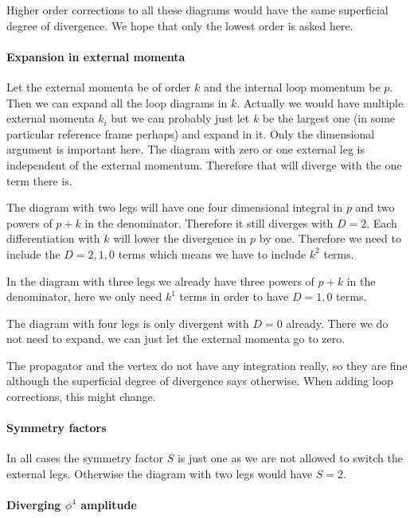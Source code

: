 \documentclass[11pt, english, fleqn, DIV=15, headinclude]{scrartcl}
\begin{document}
Higher order corrections to all these diagrams would have the same superficial
degree of divergence. We hope that only the lowest order is asked here.

\paragraph{Expansion in external momenta}

Let the external momenta be of order $k$ and the internal loop momentum be $p$.
Then we can expand all the loop diagrams in $k$. Actually we would have
multiple external momenta $k_i$ but we can probably just let $k$ be the largest
one (in some particular reference frame perhaps) and expand in it. Only the
dimensional argument is important here. The diagram with zero or one external
leg is independent of the external momentum. Therefore that will diverge with
the one term there is.

The diagram with two legs will have one four dimensional integral in $p$ and
two powers of $p + k$ in the denominator. Therefore it still diverges with $D =
2$. Each differentiation with $k$ will lower the divergence in $p$ by one.
Therefore we need to include the $D = 2, 1, 0$ terms which means we have to
include $k^2$ terms.

In the diagram with three legs we already have three powers of $p + k$ in the
denominator, here we only need $k^1$ terms in order to have $D = 1, 0$ terms.

The diagram with four legs is only divergent with $D = 0$ already. There we do
not need to expand, we can just let the external momenta go to zero.

The propagator and the vertex do not have any integration really, so they are
fine although the superficial degree of divergence says otherwise. When adding
loop corrections, this might change.

\paragraph{Symmetry factors}

In all cases the symmetry factor $S$ is just one as we are not allowed to
switch the external legs. Otherwise the diagram with two legs would have $S =
2$.

\paragraph{Diverging $\phi^4$ amplitude}
\end{document}

